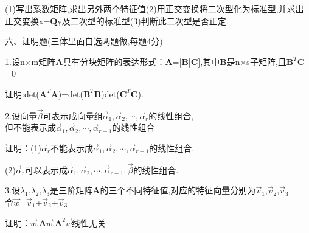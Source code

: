 \documentclass[a4paper]{article} %
\begin{document}
(1)写出系数矩阵,求出另外两个特征值(2)用正交变换将二次型化为标准型,并求出正交变换x=\(\mathbf{Q}\)y及二次型的标准型(3)判断此二次型是否正定.

\clearpage

六、证明题(三体里面自选两题做,每题4分)

1.设n\(\times\)m矩阵\(\mathbf{A}\)具有分块矩阵的表达形式：\(\mathbf{A}\)=[\(\mathbf{B}\)|\(\mathbf{C}\)],其中\(\mathbf{B}\)是n\(\times\)s子矩阵,且\(\mathbf{B}^T\mathbf{C}\)=0

证明:det(\(\mathbf{A}^T\mathbf{A}\))=det(\(\mathbf{B}^T\mathbf{B}\))det(\(\mathbf{C}^T\mathbf{C}\)).

2.设向量\(\vec{\beta}\)可表示成向量组\(\vec{\alpha}_1,\vec{\alpha}_2,\cdots,\vec{\alpha}_r\)的线性组合,\\但不能表示成\(\vec{\alpha}_1,\vec{\alpha}_2,\cdots,\vec{\alpha}_{r-1}\)的线性组合

证明：(1)\(\vec{\alpha}_r\)不能表示成\(\vec{\alpha}_1,\vec{\alpha}_2,\cdots,\vec{\alpha}_{r-1}\)的线性组合.

(2)\(\vec{\alpha}_r\)可以表示成\(\vec{\alpha}_1,\vec{\alpha}_2,\cdots,\vec{\alpha}_{r-1},\vec{\beta}\)的线性组合.

3.设\(\lambda_1\),\(\lambda_2\),\(\lambda_3\)是三阶矩阵\(\mathbf{A}\)的三个不同特征值,对应的特征向量分别为\(\vec{v}_1\),\(\vec{v}_2\),\(\vec{v}_3\).\\令\(\vec{w}\)=\(\vec{v}_1\)+\(\vec{v}_2\)+\(\vec{v}_3\)

证明：\(\vec{w}\),\(\mathbf{A}\)\(\vec{w}\),\(\mathbf{A}^2\)\(\vec{w}\)线性无关
\end{document}
